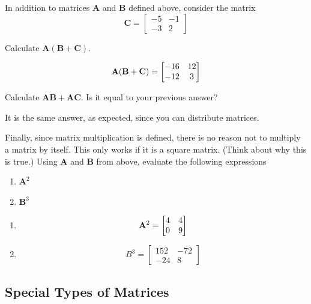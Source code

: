 In addition to matrices $\mathbf{A}$ and $ \mathbf{B}$ defined above, consider the matrix
\[ \mathbf{C} =
\left[\begin{array}{rr}
-5 & -1 \\
-3 & 2
\end{array}\right]
\]

\begin{prob}
Calculate  $\mathbf{A} (\mathbf{B} + \mathbf{C}) $.
\end{prob}
\begin{sol}\[ \mathbf{A} (\mathbf{B} + \mathbf{C}) = \begin{bmatrix} -16 & 12 \\ -12 & 3\end{bmatrix} \]
\end{sol}
\begin{prob}
Calculate  $\mathbf{A} \mathbf{B} + \mathbf{A} \mathbf{C}$. Is it equal to your previous answer?
\end{prob}
\begin{sol}It is the same answer, as expected, since you can distribute matrices.\end{sol}

Finally, since matrix multiplication is defined, there is no reason not to multiply a matrix by itself. This only works if it is a square matrix. (Think about why this is true.) Using $\mathbf{A}$ and $\mathbf{B}$ from above, evaluate the following expressions

\begin{prob}
\begin{enumerate}
\item $\mathbf{A}^2$
\item $\mathbf{B}^3$
\end{enumerate}
\end{prob}
\begin{sol}
\begin{enumerate}
    \item \[ \mathbf{A}^2 = \begin{bmatrix} 4 & 4 \\ 0 & 9\end{bmatrix}\]
    \item $$B^3 = \begin{bmatrix}
    152 & -72 \\ -24 & 8
    \end{bmatrix}$$
\end{enumerate}
\end{sol}


\subsection{Special Types of Matrices}

